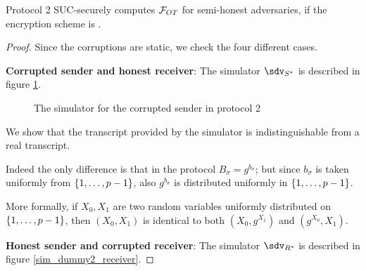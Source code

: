 \begin{proposition}
    Protocol 2 SUC-securely computes $\mathcal{F}_{OT}$ for semi-honest adversaries, if the encryption scheme is \indcpa.
\end{proposition}
\begin{proof}
    Since the corruptions are static, we check the four different cases.

    \textbf{Corrupted sender and honest receiver}: The simulator $\sdv_{S^\ast}$ is described in figure \ref{sim_dummy2_sender}.

    \begin{figure}
        \begin{center}
        \end{center}
        \caption{The simulator for the corrupted sender in protocol 2}
        \label{sim_dummy2_sender}
    \end{figure}

    We show that the transcript provided by the simulator is indistinguishable from a real transcript.

    Indeed the only difference is that in the protocol $B_\sigma = g^{b_\sigma}$; but since $b_\sigma$ is taken uniformly from $\set{1,\dots,p-1}$, also $g^{b_\sigma}$ is distributed uniformly in $\set{1,\dots,p-1}$.

    More formally, if $X_0,X_1$ are two random variables uniformly distributed on $\set{1,\dots,p-1}$, then $(X_0,X_1)$ is identical to both $(X_0, g^{X_1})$ and $(g^{X_0}, X_1)$.

    \textbf{Honest sender and corrupted receiver}: The simulator $\sdv_{R^\ast}$ is described in figure \ref{sim_dummy2_receiver}.


\end{proof}

